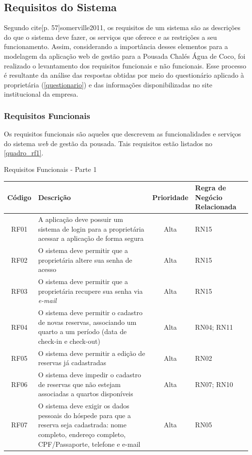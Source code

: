 \documentclass[
	12pt,				%
	openany,			%
	twoside,			%
	a4paper,			%
	english,			%
	french,				%
	spanish,			%
	brazil				%
	]{abntex2}
\begin{document}
\subsection{Requisitos do Sistema}
Segundo cite[p. 57]{somerville2011}, os requisitos de um sistema são as descrições do que o sistema deve fazer, os serviços que oferece e as restrições a seu funcionamento. Assim, considerando a importância desses elementos para a modelagem da aplicação web de gestão para a Pousada Chalés Água de Coco, foi realizado o levantamento dos requisitos funcionais e não funcionais. Esse processo é resultante da análise das respostas obtidas por meio do questionário aplicado à proprietária (\autoref{questionario}) e das informações disponibilizadas no site institucional da empresa. 
\subsubsection{Requisitos Funcionais}
Os requisitos funcionais são aqueles que descrevem as funcionalidades e serviços do sistema \textit{web} de gestão da pousada. Tais requisitos estão listados no \autoref{quadro_rf1}.

\begin{quadro}[H]
	\caption{Requisitos Funcionais - Parte 1}
	\label{quadro_rf1}
	\begin{tabular}{|c|p{5cm}|c|p{4cm}|}
		\hline
		\textbf{Código} & \textbf{Descrição} & \textbf{Prioridade} & \textbf{Regra de Negócio Relacionada} \\ \hline
		RF01 & A aplicação deve possuir um sistema de login para a proprietária acessar a aplicação de forma segura & Alta & RN15 \\ \hline
		RF02 & O sistema deve permitir que a proprietária altere sua senha de acesso  & Alta & RN15 \\ \hline
		RF03 & O sistema deve permitir que a proprietária recupere sua senha via \textit{e-mail} & Alta & RN15 \\ \hline
		RF04 & O sistema deve permitir o cadastro de novas reservas, associando um quarto a um período (data de check-in e check-out) & Alta & RN04; RN11 \\ \hline
		RF05 & O sistema deve permitir a edição de reservas já cadastradas & Alta & RN02 \\ \hline
		RF06 & O sistema deve impedir o cadastro de reservas que não estejam associadas a quartos disponíveis & Alta & RN07; RN10 \\ \hline
		RF07 & O sistema deve exigir os dados pessoais do hóspede para que a reserva seja cadastrada: nome completo, endereço completo, CPF/Passaporte, telefone e e-mail & Alta & RN05 \\ \hline
	\end{tabular}
\end{quadro}
\end{document}
